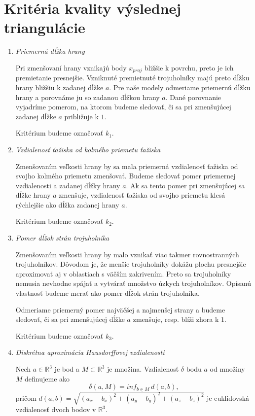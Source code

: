 \section{Kritéria kvality výslednej triangulácie}
\begin{enumerate}
\item{
    \textit{Priemerná dĺžka hrany}

    Pri zmenšovaní hrany vznikajú body $x_{proj}$ bližšie k povrchu, preto je ich premietanie
    presnejšie. Vzniknuté premietnuté trojuholníky majú preto dĺžku hrany bližšiu k zadanej dĺžke 
    $a$. Pre naše modely odmeriame priemernú dĺžku hrany a porovnáme ju so zadanou dĺžkou hrany $a$. 
    Dané porovnanie vyjadríme 
    pomerom, na ktorom budeme sledovať, či sa pri zmenšujúcej zadanej dĺžke $a$ približuje k $1$.

    Kritérium budeme označovať $k_1$.
}
\item{
    \textit{Vzdialenosť ťažiska od kolmého priemetu ťažiska}

    Zmenšovaním veľkosti hrany by sa mala priemerná vzdialenosť ťažiska od svojho kolmého 
    priemetu zmenšovať. Budeme sledovať pomer priemernej 
    vzdialenosti a zadanej dĺžky hrany $a$. Ak sa tento pomer pri zmenšujúcej sa dĺžke hrany 
    $a$ zmenšuje, vzdialenosť
    ťažiska od svojho priemetu klesá rýchlejšie ako dĺžka zadanej hrany $a$.

    Kritérium budeme označovať $k_2$.
}
\item{
    \textit{Pomer dĺžok strán trojuholníka}

    Zmenšovaním veľkosti hrany by malo vznikať viac takmer rovnostranných trojuholníkov.
    Dôvodom je, že menšie trojuholníky dokážu plochu presnejšie aproximovať aj v oblastiach 
    s väčším zakrivením. Preto sa trojuholníky nemusia nevhodne spájať a vytvárať množstvo 
    úzkych trojuholníkov. Opísanú vlastnosť budeme merať ako pomer dĺžok strán trojuholníka. 

    Odmeriame priemerný pomer najväčšej a najmenšej strany a budeme sledovať, či sa pri 
    zmenšujúcej dĺžke $a$ zmenšuje, resp. blíži zhora k $1$.

    Kritérium budeme označovať $k_3$.
}
\item{
    \textit{Diskrétna aproximácia Hausdorffovej vzdialenosti}

    \begin{definition}
        Nech $a \in \mathbb{R}^3$ je bod a $M \subset \mathbb{R}^3$ je množina.
        Vzdialenosť $\delta$ bodu $a$ od množiny $M$ definujeme ako
        \begin{equation}
            \delta(a, M) = inf_{b \in M} \, d(a, b),
        \end{equation}
        pričom $d(a, b) = \sqrt{(a_x-b_x)^2 + (a_y-b_y)^2 + (a_z-b_z)^2}$ je euklidovská 
        vzdialenosť dvoch bodov v $\mathbb{R}^3$.
    \end{definition}

}
\end{enumerate}
